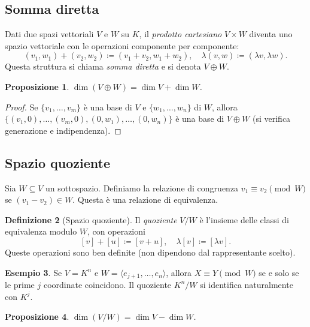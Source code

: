 \documentclass[11pt, a4paper]{book}
\theoremstyle{definition}
\newtheorem{definizione}{Definizione}[section]
\newtheorem{esempio}[definizione]{Esempio}
\theoremstyle{plain}
\newtheorem{proposizione}[definizione]{Proposizione}
\theoremstyle{remark}
\begin{document}
\subsection{Somma diretta}

Dati due spazi vettoriali $V$ e $W$ su $K$, il \emph{prodotto cartesiano} $V \times W$ diventa uno spazio vettoriale con le operazioni componente per componente:
\[
  (v_1, w_1) + (v_2, w_2) \coloneqq (v_1+v_2, w_1+w_2), \quad \lambda(v,w) \coloneqq (\lambda v, \lambda w).
\]
Questa struttura si chiama \emph{somma diretta} e si denota $V \oplus W$.

\begin{proposizione}
$\dim(V \oplus W) = \dim V + \dim W$.
\end{proposizione}

\begin{proof}
Se $\{v_1,\ldots,v_m\}$ è una base di $V$ e $\{w_1,\ldots,w_n\}$ di $W$, allora
$\{(v_1,0),\ldots,(v_m,0),(0,w_1),\ldots,(0,w_n)\}$
è una base di $V \oplus W$ (si verifica generazione e indipendenza).
\end{proof}

\subsection{Spazio quoziente}

Sia $W \subseteq V$ un sottospazio. Definiamo la relazione di congruenza $v_1 \equiv v_2 \pmod{W}$ se $(v_1 - v_2) \in W$. Questa è una relazione di equivalenza.

\begin{defbox}
\begin{definizione}[Spazio quoziente]
Il \emph{quoziente} $V/W$ è l'insieme delle classi di equivalenza modulo $W$, con operazioni
\[
  [v] + [u] \coloneqq [v+u], \quad \lambda[v] \coloneqq [\lambda v].
\]
Queste operazioni sono ben definite (non dipendono dal rappresentante scelto).
\end{definizione}
\end{defbox}

\begin{exbox}
\begin{esempio}
Se $V = K^n$ e $W = \langle e_{j+1}, \ldots, e_n \rangle$, allora $X \equiv Y \pmod{W}$ se e solo se le prime $j$ coordinate coincidono. Il quoziente $K^n/W$ si identifica naturalmente con $K^j$.
\end{esempio}
\end{exbox}

\begin{proposizione}
$\dim(V/W) = \dim V - \dim W$.
\end{proposizione}
\end{document}
